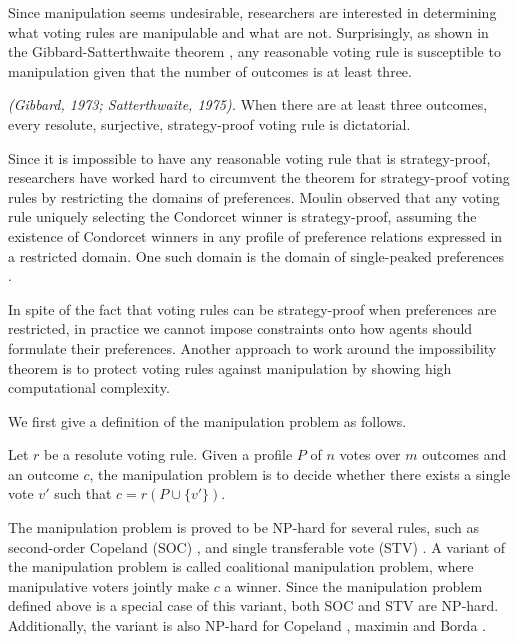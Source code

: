 Since manipulation seems undesirable, researchers are
interested in determining what voting rules are
manipulable and what are not.
Surprisingly, as shown in the Gibbard-Satterthwaite
theorem \cite{gib:j:maip-scheme,satt:j:strat-proof},
any reasonable voting rule is susceptible to
manipulation given that the number of outcomes
is at least three.

\begin{thm}
\label{thm:Gib_Sat}
\emph{(Gibbard, 1973; Satterthwaite, 1975).}
	When there are at least three outcomes,
	every resolute, surjective, strategy-proof voting rule is
	dictatorial.
\end{thm}

Since it is impossible to have any reasonable voting rule that is strategy-proof,
researchers have worked hard to circumvent the theorem
for strategy-proof voting rules by restricting the domains
of preferences\cite{Brandt:COMSOC}.
Moulin \cite{Moul} observed that any voting rule uniquely selecting
the Condorcet winner is strategy-proof, assuming the existence
of Condorcet winners in any profile of preference relations
expressed in a restricted domain.
One such domain is the domain of single-peaked preferences
\cite{Sprumont}.

In spite of the fact that voting rules can be strategy-proof
when preferences are restricted, in practice we cannot impose
constraints onto how agents should formulate their preferences.
Another approach to work around the impossibility theorem is
to protect voting rules against manipulation by showing
high computational complexity.

We first give a definition of the manipulation problem as follows.
\begin{definition}
	Let $r$ be a resolute voting rule.  Given a profile $P$ of
	$n$ votes over $m$ outcomes and an outcome $c$, 
	the manipulation problem is to decide whether there exists
	a single vote $v'$ such that $c=r(P \cup \{v'\})$.
\end{definition}

The manipulation problem is proved to be NP-hard for several
rules, such as second-order Copeland (SOC) \cite{bartholdi:j:compdiff}, and
single transferable vote (STV) \cite{Bartholdi:STV}.
A variant of the manipulation problem is
called coalitional manipulation problem, where 
manipulative voters jointly make $c$ a winner.
Since the manipulation problem defined above is
a special case of this variant, both SOC and STV
are NP-hard.  Additionally, the variant is
also NP-hard for Copeland \cite{Faliszewski:Copeland},
maximin \cite{xia2009complexity} and Borda 
\cite{betzler2011unweighted,davies2011complexity}.


